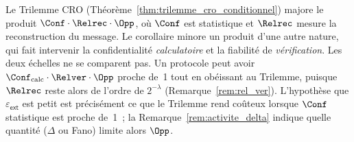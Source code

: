 \begin{sloppypar}
\begin{remark}
\label{rem:ann_pas_de_contradiction}
Le Trilemme CRO (Th\'eor\`eme~\ref{thm:trilemme_cro_conditionnel}) majore le produit
$\Conf\cdot\Relrec\cdot\Opp$, o\`u $\Conf$ est statistique et $\Relrec$ mesure la
reconstruction du message. Le corollaire minore un produit d'une autre nature, qui fait intervenir la
confidentialit\'e \emph{calculatoire} et la fiabilit\'e de \emph{v\'erification}.
Les deux \'echelles ne se comparent pas. Un protocole peut avoir
$\Conf_{\mathrm{calc}}\cdot\Relver\cdot\Opp$ proche de~1 tout en ob\'eissant au
Trilemme, puisque $\Relrec$ reste alors de l'ordre de $2^{-\lambda}$
(Remarque~\ref{rem:rel_ver}). L'hypoth\`ese que
$\varepsilon_{\mathsf{ext}}$ est petit est pr\'ecis\'ement ce que le Trilemme rend
co\^uteux lorsque $\Conf$ statistique est proche de~1~; la
Remarque~\ref{rem:activite_delta} indique quelle quantit\'e ($\Delta$ ou Fano) limite
alors $\Opp$. 
\end{remark}
\end{sloppypar}

